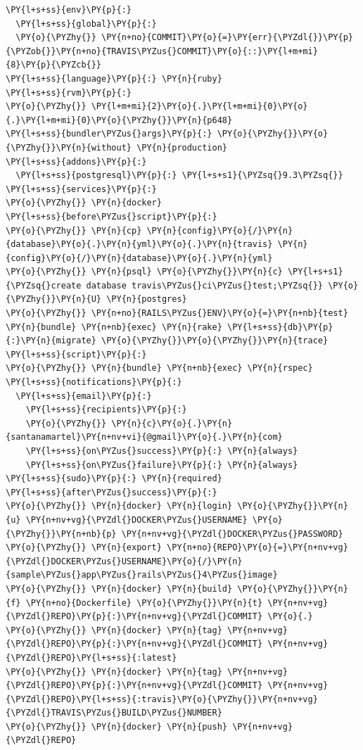 \begin{codelisting}
\label{code:travis}
\begin{Verbatim}[fontsize=\relsize{-2.5},fontseries=b,commandchars=\\\{\}]
\PY{l+s+ss}{env}\PY{p}{:}
  \PY{l+s+ss}{global}\PY{p}{:}
  \PY{o}{\PYZhy{}} \PY{n+no}{COMMIT}\PY{o}{=}\PY{err}{\PYZdl{}}\PY{p}{\PYZob{}}\PY{n+no}{TRAVIS\PYZus{}COMMIT}\PY{o}{::}\PY{l+m+mi}{8}\PY{p}{\PYZcb{}}
\PY{l+s+ss}{language}\PY{p}{:} \PY{n}{ruby}
\PY{l+s+ss}{rvm}\PY{p}{:}
\PY{o}{\PYZhy{}} \PY{l+m+mi}{2}\PY{o}{.}\PY{l+m+mi}{0}\PY{o}{.}\PY{l+m+mi}{0}\PY{o}{\PYZhy{}}\PY{n}{p648}
\PY{l+s+ss}{bundler\PYZus{}args}\PY{p}{:} \PY{o}{\PYZhy{}}\PY{o}{\PYZhy{}}\PY{n}{without} \PY{n}{production}
\PY{l+s+ss}{addons}\PY{p}{:}
  \PY{l+s+ss}{postgresql}\PY{p}{:} \PY{l+s+s1}{\PYZsq{}9.3\PYZsq{}}
\PY{l+s+ss}{services}\PY{p}{:}
\PY{o}{\PYZhy{}} \PY{n}{docker}
\PY{l+s+ss}{before\PYZus{}script}\PY{p}{:}
\PY{o}{\PYZhy{}} \PY{n}{cp} \PY{n}{config}\PY{o}{/}\PY{n}{database}\PY{o}{.}\PY{n}{yml}\PY{o}{.}\PY{n}{travis} \PY{n}{config}\PY{o}{/}\PY{n}{database}\PY{o}{.}\PY{n}{yml}
\PY{o}{\PYZhy{}} \PY{n}{psql} \PY{o}{\PYZhy{}}\PY{n}{c} \PY{l+s+s1}{\PYZsq{}create database travis\PYZus{}ci\PYZus{}test;\PYZsq{}} \PY{o}{\PYZhy{}}\PY{n}{U} \PY{n}{postgres}
\PY{o}{\PYZhy{}} \PY{n+no}{RAILS\PYZus{}ENV}\PY{o}{=}\PY{n+nb}{test} \PY{n}{bundle} \PY{n+nb}{exec} \PY{n}{rake} \PY{l+s+ss}{db}\PY{p}{:}\PY{n}{migrate} \PY{o}{\PYZhy{}}\PY{o}{\PYZhy{}}\PY{n}{trace}
\PY{l+s+ss}{script}\PY{p}{:}
\PY{o}{\PYZhy{}} \PY{n}{bundle} \PY{n+nb}{exec} \PY{n}{rspec}
\PY{l+s+ss}{notifications}\PY{p}{:}
  \PY{l+s+ss}{email}\PY{p}{:}
    \PY{l+s+ss}{recipients}\PY{p}{:}
    \PY{o}{\PYZhy{}} \PY{n}{c}\PY{o}{.}\PY{n}{santanamartel}\PY{n+nv+vi}{@gmail}\PY{o}{.}\PY{n}{com}
    \PY{l+s+ss}{on\PYZus{}success}\PY{p}{:} \PY{n}{always}
    \PY{l+s+ss}{on\PYZus{}failure}\PY{p}{:} \PY{n}{always}
\PY{l+s+ss}{sudo}\PY{p}{:} \PY{n}{required}
\PY{l+s+ss}{after\PYZus{}success}\PY{p}{:}
\PY{o}{\PYZhy{}} \PY{n}{docker} \PY{n}{login} \PY{o}{\PYZhy{}}\PY{n}{u} \PY{n+nv+vg}{\PYZdl{}DOCKER\PYZus{}USERNAME} \PY{o}{\PYZhy{}}\PY{n+nb}{p} \PY{n+nv+vg}{\PYZdl{}DOCKER\PYZus{}PASSWORD}
\PY{o}{\PYZhy{}} \PY{n}{export} \PY{n+no}{REPO}\PY{o}{=}\PY{n+nv+vg}{\PYZdl{}DOCKER\PYZus{}USERNAME}\PY{o}{/}\PY{n}{sample\PYZus{}app\PYZus{}rails\PYZus{}4\PYZus{}image}
\PY{o}{\PYZhy{}} \PY{n}{docker} \PY{n}{build} \PY{o}{\PYZhy{}}\PY{n}{f} \PY{n+no}{Dockerfile} \PY{o}{\PYZhy{}}\PY{n}{t} \PY{n+nv+vg}{\PYZdl{}REPO}\PY{p}{:}\PY{n+nv+vg}{\PYZdl{}COMMIT} \PY{o}{.}
\PY{o}{\PYZhy{}} \PY{n}{docker} \PY{n}{tag} \PY{n+nv+vg}{\PYZdl{}REPO}\PY{p}{:}\PY{n+nv+vg}{\PYZdl{}COMMIT} \PY{n+nv+vg}{\PYZdl{}REPO}\PY{l+s+ss}{:latest}
\PY{o}{\PYZhy{}} \PY{n}{docker} \PY{n}{tag} \PY{n+nv+vg}{\PYZdl{}REPO}\PY{p}{:}\PY{n+nv+vg}{\PYZdl{}COMMIT} \PY{n+nv+vg}{\PYZdl{}REPO}\PY{l+s+ss}{:travis}\PY{o}{\PYZhy{}}\PY{n+nv+vg}{\PYZdl{}TRAVIS\PYZus{}BUILD\PYZus{}NUMBER}
\PY{o}{\PYZhy{}} \PY{n}{docker} \PY{n}{push} \PY{n+nv+vg}{\PYZdl{}REPO}  
\end{Verbatim}
\end{codelisting}

